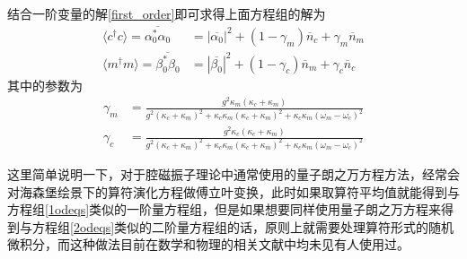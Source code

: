 结合一阶变量的解\eqref{first_order}即可求得上面方程组的解为
\begin{align}
\langle c^{\dag}c \rangle = \overline{\alpha_{0}^{*}\alpha_{0}}&=|\overline{\alpha_{0}}|^{2}+(1-\gamma_{m})\overline{n}_c+\gamma_{m}\overline{n}_m \label{photon_num} \\
\langle m^{\dag}m \rangle = \overline{\beta_{0}^{*}\beta_{0}}&=|\overline{\beta_{0}}|^{2}+(1-\gamma_{c})\overline{n}_m+\gamma_{c}\overline{n}_c \label{magnon_num}
\end{align}
其中的参数为
\begin{align}
\gamma_m&=\frac{g^2\kappa_m(\kappa_c+\kappa_m)}{g^2(\kappa_c+\kappa_m)^2+\kappa_c\kappa_m(\kappa_c+\kappa_m)^2+\kappa_c\kappa_m(\omega_{m}-\omega_{c})^2} \\
\gamma_c&=\frac{g^2\kappa_c(\kappa_c+\kappa_m)}{g^2(\kappa_c+\kappa_m)^2+\kappa_c\kappa_m(\kappa_c+\kappa_m)^2+\kappa_c\kappa_m(\omega_{m}-\omega_{c})^2}
\end{align}

这里简单说明一下，对于腔磁振子理论中通常使用的量子朗之万方程方法，经常会对海森堡绘景下的算符演化方程做傅立叶变换\cite{10.1126/sciadv.1501286Tang,Zhang2019Theory}，此时如果取算符平均值就能得到与方程组\eqref{1odeqs}类似的一阶量方程组，但是如果想要同样使用量子朗之万方程来得到与方程组\eqref{2odeqs}类似的二阶量方程组的话，原则上就需要处理算符形式的随机微积分，而这种做法目前在数学和物理的相关文献中均未见有人使用过。

